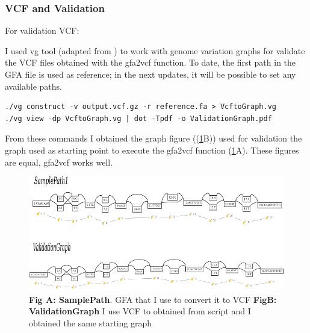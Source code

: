 
\subsubsection{VCF and Validation}

For validation VCF:

I used vg tool (adapted from \cite{vg}) to work with genome variation graphs for validate the VCF files obtained with the gfa2vcf function. To date, the first path in the GFA file is used as reference; in the next updates, it will be possible to set any available paths.


\begin{verbatim}
./vg construct -v output.vcf.gz -r reference.fa > VcftoGraph.vg
./vg view -dp VcftoGraph.vg | dot -Tpdf -o ValidationGraph.pdf
\end{verbatim}

From these commands I obtained the graph figure ((\ref{fig:Validation.png}B)) used for validation the graph used as starting point to execute the gfa2vcf function (\ref{fig:Validation.png}A). These figures are equal, gfa2vcf works well. 



\begin{figure}[H]
\centering
\includegraphics[width=1.10 \textwidth]{fig/Validation.png}
\decoRule
\caption{\textbf{Fig A: SamplePath}. GFA that I use to convert it to VCF 
\textbf{FigB: ValidationGraph} I use VCF to obtained from script and I obtained the same starting graph} 
\label{fig:Validation.png}
\end{figure}


